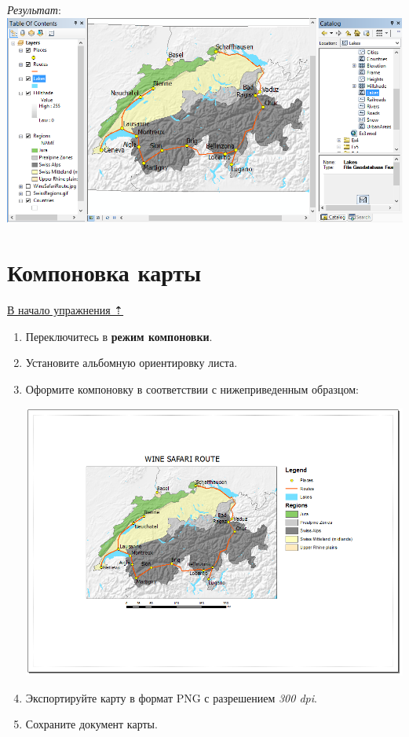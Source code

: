 \documentclass[]{book}
\theoremstyle{definition}
\theoremstyle{definition}
\theoremstyle{definition}
\theoremstyle{remark}
\begin{document}
\begin{enumerate}
  \emph{Результат}: \includegraphics{images/Ex05/image36.png}
\end{enumerate}

\hypertarget{map-ref-general-layout}{%
\section{Компоновка карты}\label{map-ref-general-layout}}

\protect\hyperlink{map-ref-general}{В начало упражнения ⇡}

\begin{enumerate}
\def\labelenumi{\arabic{enumi}.}
\item
  Переключитесь в \textbf{режим компоновки}.
\item
  Установите альбомную ориентировку листа.
\item
  Оформите компоновку в соответствии с нижеприведенным образцом:

  \includegraphics{images/Ex05/image37.png}
\item
  Экспортируйте карту в формат PNG с разрешением \emph{300 dpi}.
\item
  Сохраните документ карты.
\end{enumerate}
\end{document}
